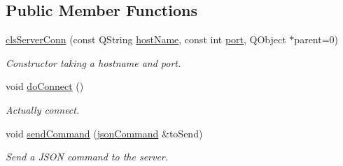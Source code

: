 \subsection*{Public Member Functions}
\begin{DoxyCompactItemize}
\item 
\hyperlink{classclient_1_1cls_server_conn_ad9d8caf021df2cd15ce27bcf207d86d0}{cls\-Server\-Conn} (const Q\-String \hyperlink{classclient_1_1cls_server_conn_a4d20263884ea30ec6874547856081bef}{host\-Name}, const int \hyperlink{classclient_1_1cls_server_conn_acd1b648e44713f2ae1fc375848b3cdf5}{port}, Q\-Object $\ast$parent=0)
\begin{DoxyCompactList}\small\item\em Constructor taking a hostname and port. \end{DoxyCompactList}\item 
void \hyperlink{classclient_1_1cls_server_conn_af4589d93eb4b606423cb4b5e4a583f4e}{do\-Connect} ()
\begin{DoxyCompactList}\small\item\em Actually connect. \end{DoxyCompactList}\item 
void \hyperlink{classclient_1_1cls_server_conn_a997f9cd3d63321807f60472308acc459}{send\-Command} (\hyperlink{class_k4_u_1_1json_command}{json\-Command} \&to\-Send)
\begin{DoxyCompactList}\small\item\em Send a J\-S\-O\-N command to the server. \end{DoxyCompactList}\end{DoxyCompactItemize}
